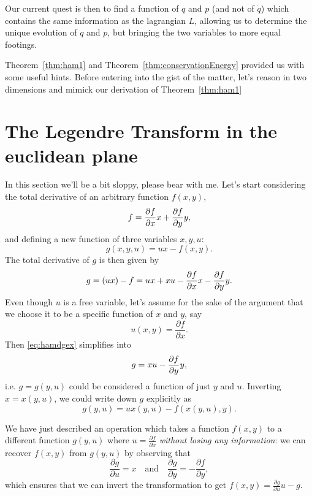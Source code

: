 \documentclass[english,fontsize=11pt,paper=a5,oneside]{scrbook}
\let\d\relax
\DeclareMathOperator{\d}{d}
\theoremstyle{definition}
\begin{document}
Our current quest is then to find a function of $q$ and $p$ (and not of $\dot q$) which contains the same information as the lagrangian $L$, allowing us to determine the unique evolution of $q$ and $p$, but bringing the two variables to more equal footings.

Theorem~\ref{thm:ham1} and Theorem~\ref{thm:conservationEnergy} provided us with some useful hints.
Before entering into the gist of the matter, let's reason in two dimensions and mimick our derivation of Theorem~\ref{thm:ham1}

\section{The Legendre Transform in the euclidean plane}

In this section we'll be a bit sloppy, please bear with me. 
%
Let's start considering the total derivative of an arbitrary function $f(x,y)$,
\begin{equation}
    \d f = \frac{\partial f}{\partial x} \d x + \frac{\partial f}{\partial y} \d y,
\end{equation}
and defining a new function of three variables $x,y,u$:
\begin{equation}
    g(x,y,u) = ux - f(x,y).
\end{equation}
The total derivative of $g$ is then given by
\begin{equation}\label{eq:hamdgex}
    \d g = \d(ux) - \d f = u\d x + x \d u - \frac{\partial f}{\partial x} \d x - \frac{\partial f}{\partial y} \d y.
\end{equation}
Even though $u$ is a free variable, let's assume for the sake of the argument that we choose it to be a specific function of $x$  and $y$, say
\begin{equation}
    u(x,y) = \frac{\partial f}{\partial x}.
\end{equation}
Then \eqref{eq:hamdgex} simplifies into
\begin{equation}
    \d g = x \d u - \frac{\partial f}{\partial y} \d y,
\end{equation}
i.e. $g=g(y,u)$ could be considered a function of just $y$ and $u$.
Inverting $x = x(y,u)$, we could write down $g$ explicitly as
\begin{equation}
    g(y,u) = u x(y,u) - f(x(y, u), y).
\end{equation}

We have just described an operation which takes a function $f(x,y)$ to a different function $g(y,u)$ where $u = \frac{\partial f}{\partial x}$ \emph{without losing any information}: we can recover $f(x,y)$ from $g(y,u)$ by observing that
\begin{equation}
    \frac{\partial g}{\partial u} = x
    \quad\mbox{and}\quad
    \frac{\partial g}{\partial y} = - \frac{\partial f}{\partial y},
\end{equation}
which ensures that we can invert the transformation to get $f(x,y) = \frac{\partial g}{\partial u}u - g$.
\end{document}
